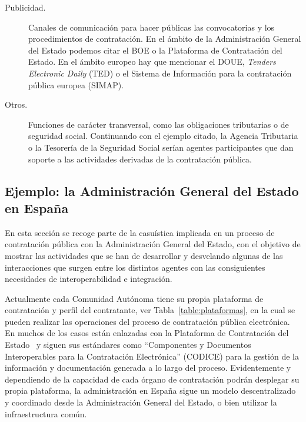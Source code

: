 \begin{description}
\item [Publicidad.] Canales de comunicación para hacer públicas las convocatorias y los procedimientos de contratación. En el 
ámbito de la Administración General del Estado podemos citar el BOE o la Plataforma
de Contratación del Estado. En el ámbito europeo hay que mencionar el DOUE, \textit{Tenders Electronic Daily} (\gls{TED}) 
o el Sistema de Información para la contratación pública europea (SIMAP).


\item [Otros.] Funciones de carácter transversal, como las obligaciones tributarias o de seguridad social. Continuando con el ejemplo citado, 
la Agencia Tributaria o la Tesorería de la Seguridad Social serían agentes participantes que dan soporte a las actividades derivadas de la contratación pública.
\end{description}


\subsection{Ejemplo: la Administración General del Estado en España}
En esta sección se recoge parte de la casuística implicada en un proceso de contratación
pública con la Administración General del Estado, con el objetivo de mostrar las actividades
que se han de desarrollar y desvelando algunas de las interacciones que surgen entre los distintos
agentes con las consiguientes necesidades de interoperabilidad e integración.

Actualmente cada Comunidad Autónoma tiene su propia plataforma de contratación y perfil
del contratante, ver Tabla~\ref{table:plataformas}, en la cual se pueden realizar las operaciones del proceso de contratación pública 
electrónica. En muchos de los casos están enlazadas con la Plataforma de Contratación del Estado~\cite{PlataformaContratacionEstado}
y siguen sus estándares como ``Componentes y Documentos Interoperables para la Contratación Electrónica'' (\gls{CODICE}) 
para la gestión de la información y documentación generada a lo largo del proceso. Evidentemente y dependiendo de 
la capacidad de cada órgano de contratación podrán desplegar su propia plataforma, la administración en España sigue un modelo
descentralizado y coordinado desde la Administración General del Estado, o bien utilizar la infraestructura común.

